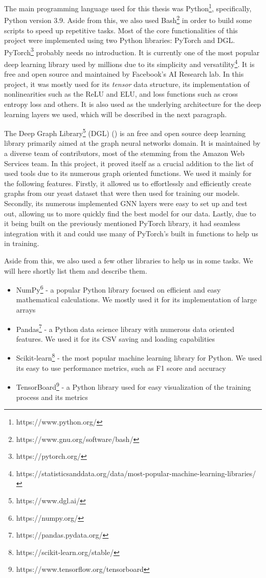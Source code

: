 \documentclass[times, utf8, diplomski, english]{fer_eng}
\begin{document}
The main programming language used for this thesis was Python\footnote{https://www.python.org/}, specifically, Python version 3.9. Aside from this, we also used Bash\footnote{https://www.gnu.org/software/bash/} in order to build some scripts to speed up repetitive tasks. Most of the core functionalities of this project were implemented using two Python libraries: PyTorch and DGL. PyTorch\footnote{https://pytorch.org/} probably needs no introduction. It is currently one of the most popular deep learning library used by millions due to its simplicity and versatility\footnote{https://statisticsanddata.org/data/most-popular-machine-learning-libraries/}. It is free and open source and maintained by Facebook's AI Research lab. In this project, it was mostly used for its \textit{tensor} data structure, its implementation of nonlinearities such as the ReLU and ELU, and loss functions such as cross entropy loss and others. It is also used as the underlying architecture for the deep learning layers we used, which will be described in the next paragraph.

The Deep Graph Library\footnote{https://www.dgl.ai/} (DGL) (\cite{DGL}) is an free and open source deep learning library primarily aimed at the graph neural networks domain. It is maintained by a diverse team of contributors, most of the stemming from the Amazon Web Services team. In this project, it proved itself as a crucial addition to the list of used tools due to its numerous graph oriented functions. We used it mainly for the following features. Firstly, it allowed us to effortlessly and efficiently create graphs from our yeast dataset that were then used for training our models. Secondly, its numerous implemented GNN layers were easy to set up and test out, allowing us to more quickly find the best model for our data. Lastly, due to it being built on the previously mentioned PyTorch library, it had seamless integration with it and could use many of PyTorch's built in functions to help us in training.

Aside from this, we also used a few other libraries to help us in some tasks. We will here shortly list them and describe them.

\begin{itemize}
	\item NumPy\footnote{https://numpy.org/} - a popular Python library focused on efficient and easy mathematical calculations. We mostly used it for its implementation of large arrays

	\item Pandas\footnote{https://pandas.pydata.org/} - a Python data science library with numerous data oriented features. We used it for its CSV saving and loading capabilities

	\item Scikit-learn\footnote{https://scikit-learn.org/stable/} - the most popular machine learning library for Python. We used its easy to use performance metrics, such as F1 score and accuracy

	\item TensorBoard\footnote{https://www.tensorflow.org/tensorboard} - a Python library used for easy visualization of the training process and its metrics
\end{itemize}
\end{document}
